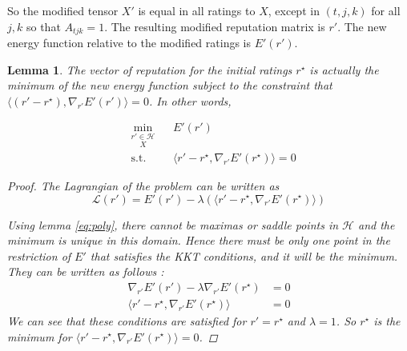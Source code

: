 \documentclass[12pt,a4paper]{article}
\newtheorem{lemma}{Lemma}
\begin{document}
So the modified tensor $X'$ is equal in all ratings to $X$, except in $(t,j,k)$ for all $j,k$ so that $A_{tjk}=1$. The resulting modified reputation matrix is $r'$. The new energy function relative to the modified ratings is $E'(r')$.
\begin{lemma}
The vector of reputation for the initial ratings $r^{\star}$ is actually the minimum of the new energy function subject to the constraint that $\langle (r'-r^{\star}),\nabla_{r'} E'(r')\rangle = 0$. In other words, 

\begin{equation*}
\begin{aligned}
& \underset{X}{\min_{r'\in \mathcal{H}}}
& & E'(r') \\
& \mathrm{s.t.}
& & \langle r'-r^{\star},\nabla_{r'} E'(r^{\star}) \rangle =0
\end{aligned}
\end{equation*}

\begin{proof}
The Lagrangian of the problem can be written as
\[
    \mathcal{L}(r') = E'(r') - \lambda (\langle r' - r^{\star},\nabla_{r'} E'(r^{\star}) \rangle )
\]

Using lemma \ref{eq:poly}, there cannot be maximas or saddle points in $\mathcal{H}$ and the minimum is unique in this domain. Hence there must be only one point in the restriction of $E'$ that satisfies the KKT conditions, and it will be the minimum.\\
They can be written as follows :
\begin{align*}
\nabla_{r'} E'(r') - \lambda \nabla_{r'} E'(r^{\star}) & = 0\\
\langle r'-r^{\star},\nabla_{r'} E'(r^{\star}) \rangle & = 0
\end{align*}
We can see that these conditions are satisfied for $r' = r^{\star}$ and $\lambda = 1$. So $r^{\star}$ is the minimum for $\langle r'-r^{\star},\nabla_{r'} E'(r^{\star}) \rangle = 0$.
\end{proof}
\end{lemma}
\end{document}
